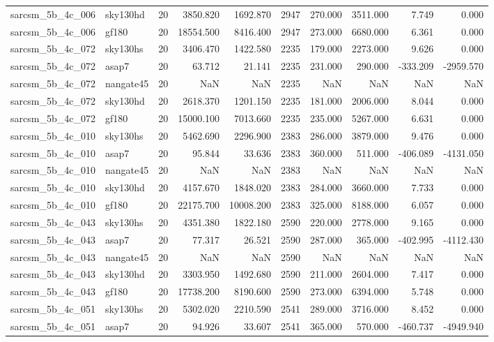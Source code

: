 \documentclass{article}
\begin{document}
\begin{longtable}{llrrrrrrrr}
sarcsm\_5b\_4c\_006 & sky130hd & 20 & 3850.820 & 1692.870 & 2947 & 270.000 & 3511.000 & 7.749 & 0.000 \\
sarcsm\_5b\_4c\_006 & gf180 & 20 & 18554.500 & 8416.400 & 2947 & 273.000 & 6680.000 & 6.361 & 0.000 \\
sarcsm\_5b\_4c\_072 & sky130hs & 20 & 3406.470 & 1422.580 & 2235 & 179.000 & 2273.000 & 9.626 & 0.000 \\
sarcsm\_5b\_4c\_072 & asap7 & 20 & 63.712 & 21.141 & 2235 & 231.000 & 290.000 & -333.209 & -2959.570 \\
sarcsm\_5b\_4c\_072 & nangate45 & 20 & NaN & NaN & 2235 & NaN & NaN & NaN & NaN \\
sarcsm\_5b\_4c\_072 & sky130hd & 20 & 2618.370 & 1201.150 & 2235 & 181.000 & 2006.000 & 8.044 & 0.000 \\
sarcsm\_5b\_4c\_072 & gf180 & 20 & 15000.100 & 7013.660 & 2235 & 235.000 & 5267.000 & 6.631 & 0.000 \\
sarcsm\_5b\_4c\_010 & sky130hs & 20 & 5462.690 & 2296.900 & 2383 & 286.000 & 3879.000 & 9.476 & 0.000 \\
sarcsm\_5b\_4c\_010 & asap7 & 20 & 95.844 & 33.636 & 2383 & 360.000 & 511.000 & -406.089 & -4131.050 \\
sarcsm\_5b\_4c\_010 & nangate45 & 20 & NaN & NaN & 2383 & NaN & NaN & NaN & NaN \\
sarcsm\_5b\_4c\_010 & sky130hd & 20 & 4157.670 & 1848.020 & 2383 & 284.000 & 3660.000 & 7.733 & 0.000 \\
sarcsm\_5b\_4c\_010 & gf180 & 20 & 22175.700 & 10008.200 & 2383 & 325.000 & 8188.000 & 6.057 & 0.000 \\
sarcsm\_5b\_4c\_043 & sky130hs & 20 & 4351.380 & 1822.180 & 2590 & 220.000 & 2778.000 & 9.165 & 0.000 \\
sarcsm\_5b\_4c\_043 & asap7 & 20 & 77.317 & 26.521 & 2590 & 287.000 & 365.000 & -402.995 & -4112.430 \\
sarcsm\_5b\_4c\_043 & nangate45 & 20 & NaN & NaN & 2590 & NaN & NaN & NaN & NaN \\
sarcsm\_5b\_4c\_043 & sky130hd & 20 & 3303.950 & 1492.680 & 2590 & 211.000 & 2604.000 & 7.417 & 0.000 \\
sarcsm\_5b\_4c\_043 & gf180 & 20 & 17738.200 & 8190.600 & 2590 & 273.000 & 6394.000 & 5.748 & 0.000 \\
sarcsm\_5b\_4c\_051 & sky130hs & 20 & 5302.020 & 2210.590 & 2541 & 289.000 & 3716.000 & 8.452 & 0.000 \\
sarcsm\_5b\_4c\_051 & asap7 & 20 & 94.926 & 33.607 & 2541 & 365.000 & 570.000 & -460.737 & -4949.940 \\

\end{longtable}
\end{document}
